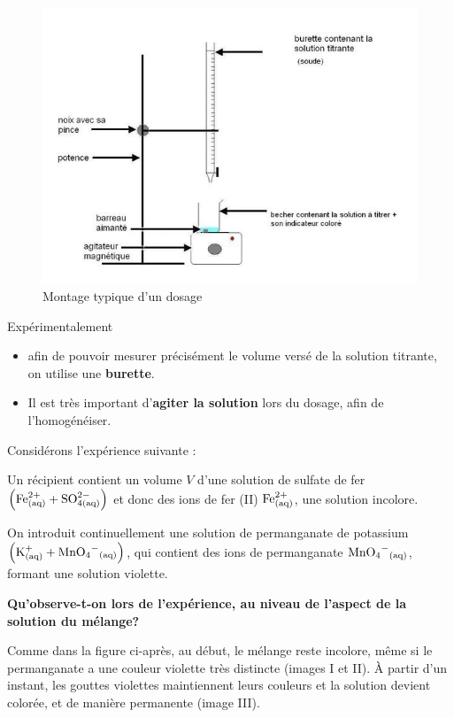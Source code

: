 \documentclass[11pt,a4paper]{article}
\begin{document}
\begingroup
\setlength{\intextsep}{10pt}%
\begin{figure}
  \centering
  \includegraphics[width=.95\linewidth]{imgs/c1/montage.jpg}
  \caption{Montage typique d'un dosage}
\end{figure}

Expérimentalement
\begin{itemize}
    \item afin de pouvoir mesurer précisément le volume versé de la solution titrante, on utilise une \textbf{burette}.  
    \item Il est très important d’\textbf{agiter la solution} lors du dosage, afin de l'homogénéiser.
\end{itemize}

Considérons l’expérience suivante :

Un récipient contient un volume $V$ d’une solution de sulfate de fer $\left(\ce{Fe^{2+}_{(aq)} + SO^{2-}_{4 (aq)}}\right)$ et donc des ions de fer (II) $\ce{Fe^{2+}_{(aq)}}$, une solution incolore. 

On introduit continuellement une solution de permanganate de potassium $\left(\ce{K^{+}_{(aq)} + MnO4^{-}_{(aq)}}\right)$, qui contient des ions de permanganate $\ce{MnO4^{-}_{(aq)}}$, formant une solution violette. 

\endgroup

\textbf{Qu'observe-t-on lors de l'expérience, au niveau de l'aspect de la solution du mélange?}  

Comme dans la figure ci-après, au début, le mélange reste incolore, même si le permanganate a une couleur violette très distincte (images I et II). À partir d'un instant, les gouttes violettes maintiennent leurs couleurs et la solution devient colorée, et de manière permanente (image III). 
\end{document}
